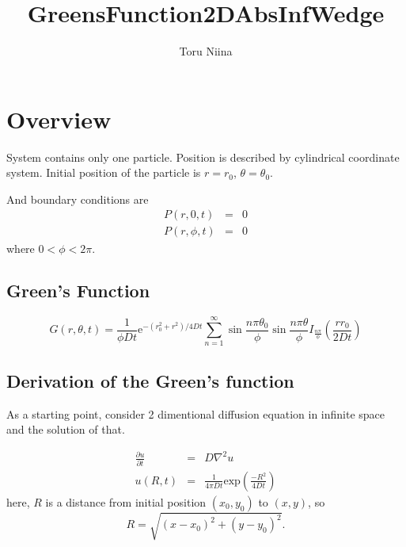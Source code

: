 \documentclass{article}
\begin{document}
\title{GreensFunction2DAbsInfWedge}
\author{Toru Niina}
\maketitle

\section{Overview}

System contains only one particle. 
 Position is described by cylindrical coordinate system.
 Initial position of the particle is $r = r_0$, $\theta = \theta_0$.

And boundary conditions are
\begin{eqnarray}
    P(r, 0, t)      &=& 0 \nonumber \\
    P(r, \phi, t)   &=& 0 \label{boundary-condition}
\end{eqnarray}
where $0 < \phi < 2\pi$.

\subsection{Green's Function}
\begin{equation}\label{greens-function}
    G(r, \theta, t) = \frac{1}{\phi Dt}\mathrm{e}^{-(r_0^2 + r^2)/4Dt}
          \sum^{\infty}_{n=1}\sin\frac{n\pi\theta_0}{\phi}\sin\frac{n\pi\theta}{\phi}
          I_{\frac{n\pi}{\phi}}\left(\frac{rr_0}{2Dt}\right)
%
\end{equation}


\subsection{Derivation of the Green's function}
As a starting point, consider 2 dimentional diffusion equation in infinite space
and the solution of that.

\begin{eqnarray}
    \frac{\partial u}{\partial t} &=& D\nabla^2 u \\
    u(R, t) &=& \frac{1}{4\pi Dt}\mathrm{exp}\left(\frac{-R^2}{4Dt}\right)
    \label{solution-infinite}
\end{eqnarray}
here, $R$ is a distance from initial position $(x_0, y_0)$ to $(x, y)$, so
\begin{equation}
 R = \sqrt{(x-x_0)^2+(y-y_0)^2}.
\end{equation}
\end{document}

